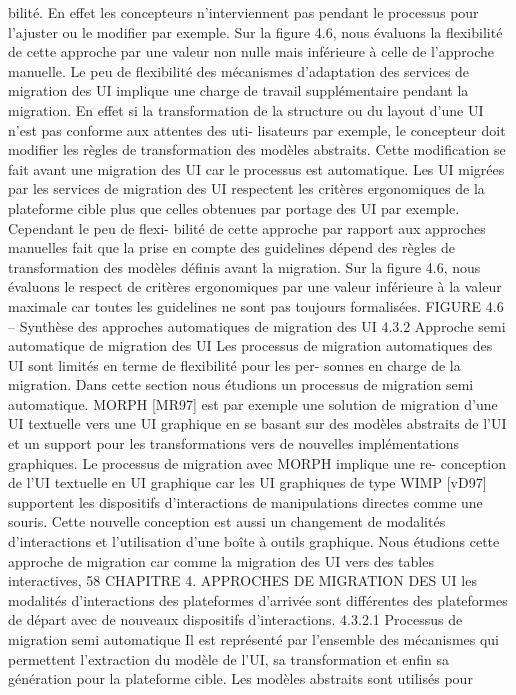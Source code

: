 \documentclass{article}
\begin{document}
bilité. En effet les concepteurs n’interviennent pas pendant le processus pour l’ajuster ou le modiﬁer
par exemple. Sur la ﬁgure 4.6, nous évaluons la ﬂexibilité de cette approche par une valeur non nulle
mais inférieure à celle de l’approche manuelle. Le peu de ﬂexibilité des mécanismes d’adaptation des
services de migration des UI implique une charge de travail supplémentaire pendant la migration. En
effet si la transformation de la structure ou du layout d’une UI n’est pas conforme aux attentes des uti-
lisateurs par exemple, le concepteur doit modiﬁer les règles de transformation des modèles abstraits.
Cette modiﬁcation se fait avant une migration des UI car le processus est automatique.
Les UI migrées par les services de migration des UI respectent les critères ergonomiques de la
plateforme cible plus que celles obtenues par portage des UI par exemple. Cependant le peu de ﬂexi-
bilité de cette approche par rapport aux approches manuelles fait que la prise en compte des guidelines
dépend des règles de transformation des modèles déﬁnis avant la migration. Sur la ﬁgure 4.6, nous
évaluons le respect de critères ergonomiques par une valeur inférieure à la valeur maximale car toutes
les guidelines ne sont pas toujours formalisées.
FIGURE 4.6 – Synthèse des approches automatiques de migration des UI
4.3.2
Approche semi automatique de migration des UI
Les processus de migration automatiques des UI sont limités en terme de ﬂexibilité pour les per-
sonnes en charge de la migration. Dans cette section nous étudions un processus de migration semi
automatique. MORPH [MR97] est par exemple une solution de migration d’une UI textuelle vers une
UI graphique en se basant sur des modèles abstraits de l’UI et un support pour les transformations vers
de nouvelles implémentations graphiques. Le processus de migration avec MORPH implique une re-
conception de l’UI textuelle en UI graphique car les UI graphiques de type WIMP [vD97] supportent
les dispositifs d’interactions de manipulations directes comme une souris. Cette nouvelle conception
est aussi un changement de modalités d’interactions et l’utilisation d’une boîte à outils graphique.
Nous étudions cette approche de migration car comme la migration des UI vers des tables interactives,
58
CHAPITRE 4. APPROCHES DE MIGRATION DES UI
les modalités d’interactions des plateformes d’arrivée sont différentes des plateformes de départ avec
de nouveaux dispositifs d’interactions.
4.3.2.1
Processus de migration semi automatique
Il est représenté par l’ensemble des mécanismes qui permettent l’extraction du modèle de l’UI, sa
transformation et enﬁn sa génération pour la plateforme cible. Les modèles abstraits sont utilisés pour
\end{document}

